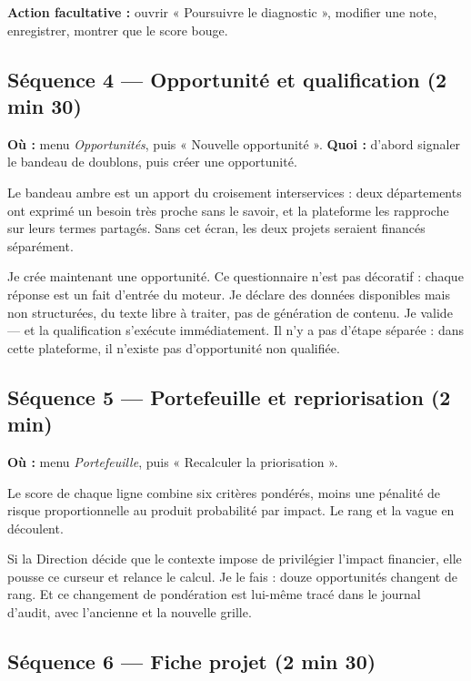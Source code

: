 \textbf{Action facultative :} ouvrir « Poursuivre le diagnostic », modifier une note,
enregistrer, montrer que le score bouge.

\subsection*{Séquence 4 — Opportunité et qualification (2 min 30)}

\textbf{Où :} menu \emph{Opportunités}, puis « Nouvelle opportunité ».\quad
\textbf{Quoi :} d'abord signaler le bandeau de doublons, puis créer une opportunité.

\begin{oral}
Le bandeau ambre est un apport du croisement interservices : deux départements ont
exprimé un besoin très proche sans le savoir, et la plateforme les rapproche sur leurs
termes partagés. Sans cet écran, les deux projets seraient financés séparément.

Je crée maintenant une opportunité. Ce questionnaire n'est pas décoratif : chaque
réponse est un fait d'entrée du moteur. Je déclare des données disponibles mais non
structurées, du texte libre à traiter, pas de génération de contenu. Je valide — et la
qualification s'exécute immédiatement. Il n'y a pas d'étape séparée : dans cette
plateforme, il n'existe pas d'opportunité non qualifiée.
\end{oral}

\subsection*{Séquence 5 — Portefeuille et repriorisation (2 min)}

\textbf{Où :} menu \emph{Portefeuille}, puis « Recalculer la priorisation ».

\begin{oral}
Le score de chaque ligne combine six critères pondérés, moins une pénalité de risque
proportionnelle au produit probabilité par impact. Le rang et la vague en découlent.

Si la Direction décide que le contexte impose de privilégier l'impact financier, elle
pousse ce curseur et relance le calcul. Je le fais : douze opportunités changent de
rang. Et ce changement de pondération est lui-même tracé dans le journal d'audit, avec
l'ancienne et la nouvelle grille.
\end{oral}

\subsection*{Séquence 6 — Fiche projet (2 min 30)}

